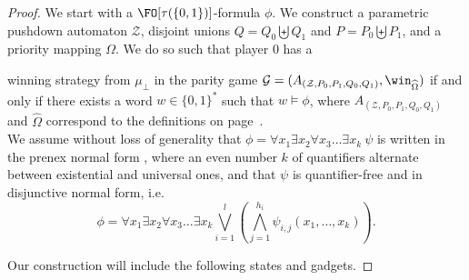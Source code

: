 \begin{proof}

We start with
 a $\FO[\tau(\{0,1\})]$-formula $\phi$.
%
We construct
a  parametric pushdown automaton $\mathcal{Z}$,
 disjoint
unions
 $Q = Q_0  \biguplus Q_1 $ and $P = P_0 \biguplus P_1$,
  and a priority mapping $\Omega$. 
We do so such that
player $0$ has a 

		winning strategy from $\mu_\bot$ in the parity game
		$\mathcal{G} =(A_{(\mathcal{Z}, P_0, P_1, Q_0 , Q_1)}, \win_{\widehat{\Omega}})$ 
if and only if
there exists
a word $w \in \{0,1\}^*$ such that
$w  \models \phi $, 
where 
$A_{(\mathcal{Z}, P_0, P_1, Q_0 , Q_1)}$
and
$\widehat{\Omega}$
correspond to the definitions on page~\pageref{PPDA reachability game}. \\

\noindent
We assume without loss of generality that $\phi = \forall x_1 \exists x_2 \forall x_3 \ldots \exists x_k ~ \psi$ is written in the prenex normal form%
, where 
an even number $k$ of quantifiers alternate between existential and universal ones, and 
that $\psi$ is quantifier-free and in disjunctive normal form, i.e.
 $$\phi = \forall x_1 \exists x_2 \forall x_3 \ldots \exists x_k \bigvee_{i=1}^l(\bigwedge_{j=1}^{h_i} \psi_{i,j}(x_1, \ldots, x_k)).$$




Our construction will include the following states and gadgets.


\end{proof}
